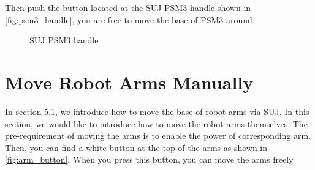 Then push the button located at the SUJ PSM3 handle shown in \autoref{fig:psm3_handle}, you are free to move the base of PSM3 around.

\begin{figure}[H]
\centering
{}
\hfil
{}
\caption{SUJ PSM3 handle}
\label{fig:psm3_handle}
\end{figure}

\section{Move Robot Arms Manually}

In section 5.1, we introduce how to move the base of robot arms via SUJ. In this section, we would like to introduce how to move the robot arms themselves. The pre-requirement of moving the arms is to enable the power of corresponding arm. Then, you can find a white button at the top of the arms as shown in \autoref{fig:arm_button}. When you press this button, you can move the arms freely.

